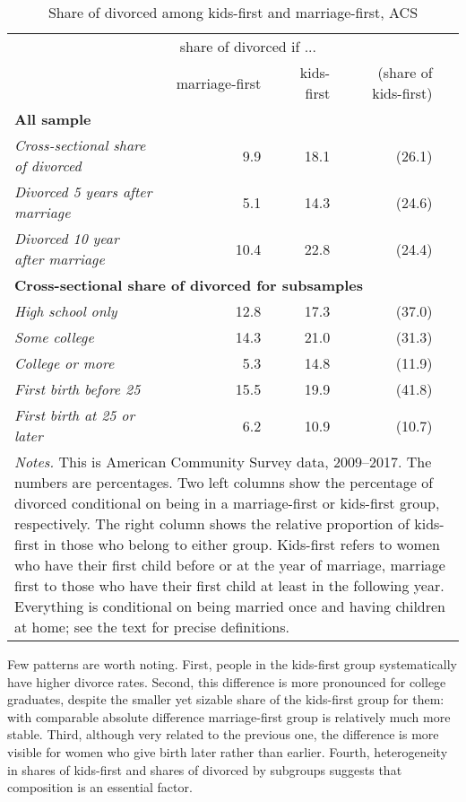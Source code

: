 \documentclass[12pt,letter]{article}
\begin{document}
\begin{table}[h]
\caption{Share of divorced among kids-first and marriage-first, ACS\label{share_table_0}}
\begin{tabular}{l r r r r }
\hline
& \multicolumn{2}{c}{share of divorced if ... }&  \\
&  marriage-first & kids-first & (share of kids-first) &  \\\hline
\multicolumn{5}{l}{\textbf{All sample}} \\\hline
\textit{Cross-sectional share of divorced} &  9.9 & 18.1 & (26.1) \\
\textit{Divorced 5 years after marriage} &  5.1 & 14.3  & (24.6) \\
\textit{Divorced 10 year after marriage} & 10.4 & 22.8 & (24.4) \\\hline
\multicolumn{5}{l}{\textbf{Cross-sectional share of divorced for subsamples}} \\\hline
\textit{High school only} &  12.8 & 17.3 & (37.0) \\
\textit{Some college} & 14.3 & 21.0 & (31.3) \\
\textit{College or more} &   5.3 & 14.8 & (11.9) \\\hline
\textit{First birth before 25} & 15.5 & 19.9 & (41.8) \\
\textit{First birth at 25 or later} &  6.2 & 10.9 & (10.7)  \\\hline
 \multicolumn{5}{p{0.9\linewidth}}{\footnotesize \textit{Notes.} This is American Community Survey data, 2009--2017. The numbers are percentages. Two left columns show the percentage of divorced conditional on being in a marriage-first or kids-first group, respectively. The right column shows the relative proportion of kids-first in those who belong to either group. Kids-first refers to women who have their first child before or at the year of marriage, marriage first to those who have their first child at least in the following year. Everything is conditional on being married once and having children at home; see the text for precise definitions. }\\\hline\hline
\end{tabular}
\end{table}

Few patterns are worth noting. First, people in the kids-first group systematically have higher divorce rates. Second, this difference is more pronounced for college graduates, despite the smaller yet sizable share of the kids-first group for them: with comparable absolute difference marriage-first group is relatively much more stable. Third, although very related to the previous one, the difference is more visible for women who give birth later rather than earlier. Fourth, heterogeneity in shares of kids-first and shares of divorced by subgroups suggests that composition is an essential factor. 
\end{document}
